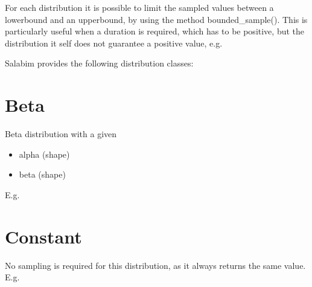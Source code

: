 \documentclass[letterpaper,10pt,english]{sphinxmanual}
\begin{document}
For each distribution it is possible to limit the sampled values between a lowerbound and an upperbound, by using
the method bounded\_sample(). This is particularly useful when a duration is required, which has to be positive, but the distribution
it self does not guarantee a positive value, e.g.

\begin{sphinxVerbatim}[commandchars=\\\{\}]
  
\end{sphinxVerbatim}

Salabim provides the following distribution classes:


\section{Beta}
\label{\detokenize{Distributions:beta}}
Beta distribution with a given
\begin{itemize}
\item {} 
alpha (shape)

\item {} 
beta (shape)

\end{itemize}

E.g.

\begin{sphinxVerbatim}[commandchars=\\\{\}]
    
\end{sphinxVerbatim}


\section{Constant}
\label{\detokenize{Distributions:constant}}
No sampling is required for this distribution, as it always returns the same value. E.g.

\begin{sphinxVerbatim}[commandchars=\\\{\}]
  
\end{sphinxVerbatim}
\end{document}
